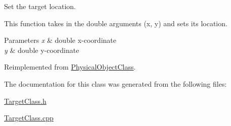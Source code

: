 Set the target location. 

This function takes in the double arguments (x, y) and sets its location.


\begin{DoxyParams}{Parameters}
{\em x} & double x-\/coordinate \\
\hline
{\em y} & double y-\/coordinate \\
\hline
\end{DoxyParams}


Reimplemented from \hyperlink{classPhysicalObjectClass_a3f9833aa04aa438de63b82fc761910ba}{Physical\-Object\-Class}.



The documentation for this class was generated from the following files\-:\begin{DoxyCompactItemize}
\item 
\hyperlink{TargetClass_8h}{Target\-Class.\-h}\item 
\hyperlink{TargetClass_8cpp}{Target\-Class.\-cpp}\end{DoxyCompactItemize}

